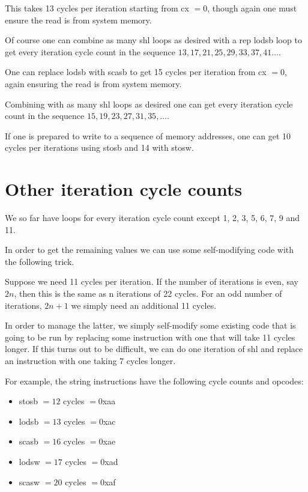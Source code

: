 \documentclass[a4paper,10pt]{amsart}
\begin{document}
This takes 13 cycles per iteration starting from cx $= 0$, though again one
must ensure the read is from system memory.

Of course one can combine as many shl loops as desired with a rep lodsb loop
to get every iteration cycle count in the sequence $13, 17, 21, 25, 29, 33, 37,
41\ldots$.

One can replace lodsb with scasb to get 15 cycles per iteration from cx $= 0$,
again ensuring the read is from system memory.

Combining with as many shl loops as desired one can get every iteration cycle
count in the sequence $15, 19, 23, 27, 31, 35, \ldots$.

If one is prepared to write to a sequence of memory addresses, one can get 10
cycles per iterations using stosb and 14 with stosw.

\section{Other iteration cycle counts}

We so far have loops for every iteration cycle count except 1, 2, 3, 5, 6, 7,
9 and 11.

In order to get the remaining values we can use some self-modifying code with
the following trick.

Suppose we need 11 cycles per iteration. If the number of iterations is even,
say $2n$, then this is the same as n iterations of 22 cycles. For an odd number
of iterations, $2n + 1$ we simply need an additional 11 cycles.

In order to manage the latter, we simply self-modify some existing code that
is going to be run by replacing some instruction with one that will take 11
cycles longer. If this turns out to be difficult, we can do one iteration of
shl and replace an instruction with one taking 7 cycles longer.

For example, the string instructions have the following cycle counts and
opcodes:

\begin{itemize}
\item stosb $= 12$ cycles $= 0$xaa
\item lodsb $= 13$ cycles $= 0$xac
\item scasb $= 16$ cycles $= 0$xae
\item lodsw $= 17$ cycles $= 0$xad
\item scasw $= 20$ cycles $= 0$xaf
\end{itemize}
\end{document}
